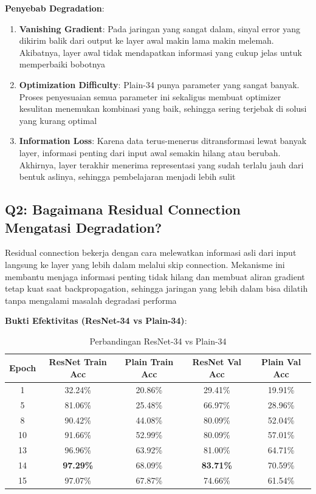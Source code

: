 \textbf{Penyebab Degradation}:
\begin{enumerate}
    \item \textbf{Vanishing Gradient}: Pada jaringan yang sangat dalam, sinyal error yang dikirim balik dari output ke layer awal makin lama makin melemah. Akibatnya, layer awal tidak mendapatkan informasi yang cukup jelas untuk memperbaiki bobotnya
    \item \textbf{Optimization Difficulty}: Plain-34 punya parameter yang sangat banyak. Proses penyesuaian semua parameter ini sekaligus membuat optimizer kesulitan menemukan kombinasi yang baik, sehingga sering terjebak di solusi yang kurang optimal
    \item \textbf{Information Loss}: Karena data terus-menerus ditransformasi lewat banyak layer, informasi penting dari input awal semakin hilang atau berubah. Akhirnya, layer terakhir menerima representasi yang sudah terlalu jauh dari bentuk aslinya, sehingga pembelajaran menjadi lebih sulit
\end{enumerate}

\FloatBarrier

\subsection{Q2: Bagaimana Residual Connection Mengatasi Degradation?}

Residual connection bekerja dengan cara melewatkan informasi asli dari input langsung ke layer yang lebih dalam melalui skip connection. Mekanisme ini membantu menjaga informasi penting tidak hilang dan membuat aliran gradient tetap kuat saat backpropagation, sehingga jaringan yang lebih dalam bisa dilatih tanpa mengalami masalah degradasi performa

\textbf{Bukti Efektivitas (ResNet-34 vs Plain-34)}:

\begin{table}[h]
\centering
\caption{Perbandingan ResNet-34 vs Plain-34}
\scriptsize
\begin{tabular}{|c|c|c|c|c|}
\hline
\textbf{Epoch} & \textbf{ResNet Train Acc} & \textbf{Plain Train Acc} & \textbf{ResNet Val Acc} & \textbf{Plain Val Acc} \\
\hline
1  & 32.24\% & 20.86\% & 29.41\% & 19.91\% \\
5  & 81.06\% & 25.48\% & 66.97\% & 28.96\% \\
8  & 90.42\% & 44.08\% & 80.09\% & 52.04\% \\
10 & 91.66\% & 52.99\% & 80.09\% & 57.01\% \\
13 & 96.96\% & 63.92\% & 81.00\% & 64.71\% \\
14 & \textbf{97.29\%} & 68.09\% & \textbf{83.71\%} & 70.59\% \\
15 & 97.07\% & 67.87\% & 74.66\% & 61.54\% \\
\hline
\end{tabular}
\end{table}

